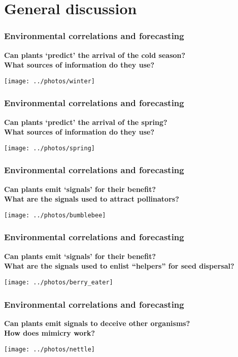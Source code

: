 \documentclass[10pt]{beamer}
\begin{document}
\section{General discussion}

\begin{frame}
\frametitle{Environmental correlations and forecasting \Discussion}

\textbf{Can plants `predict' the arrival of the cold season?\\
 What sources of information do they use?}

    \centering
    \texttt{[image: ../photos/winter]}
\end{frame}

\begin{frame}
\frametitle{Environmental correlations and forecasting \Discussion}

\textbf{Can plants `predict' the arrival of the spring?\\
 What sources of information do they use?}

    \centering
    \texttt{[image: ../photos/spring]}
\end{frame}

\begin{frame}
\frametitle{Environmental correlations and forecasting \Discussion}

\textbf{Can plants emit `signals' for their benefit?\\
What are the signals used to attract pollinators?}

    \centering
    \texttt{[image: ../photos/bumblebee]}
\end{frame}

\begin{frame}
\frametitle{Environmental correlations and forecasting \Discussion}

\textbf{Can plants emit `signals' for their benefit?\\
What are the signals used to enlist ``helpers'' for seed dispersal?}

    \centering
    \texttt{[image: ../photos/berry\_eater]}
\end{frame}

\begin{frame}
\frametitle{Environmental correlations and forecasting \Discussion}

\textbf{Can plants emit signals to deceive other organisms?\\
How does mimicry work?}

    \centering
    \texttt{[image: ../photos/nettle]}
\end{frame}
\end{document}
